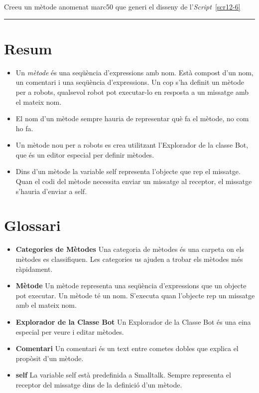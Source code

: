 \begin{center}
\colorbox{black}{}
\end{center}
{\small
\noindent
Creeu un mètode anomenat \textsf{marc50} que generi el disseny de l'\emph{Script}~\ref{scr12-6}}\\
\noindent
\rule{\textwidth}{3pt}

\section{Resum}
\begin{itemize}
\item Un \emph{mètode} és una seqüència d'expressions amb nom. Està compost d'un nom, un comentari i una seqüència d'expressions. Un cop s'ha definit un mètode per a robots, qualsevol robot pot executar-lo en resposta a un missatge amb el mateix nom. 
\item El nom d'un mètode sempre hauria de representar què fa el mètode, no com ho fa.
\item Un mètode nou per a robots es crea utilitzant l'\textsf{Explorador de la classe Bot}, que és un editor especial per definir mètodes.
\item Dins d'un mètode la variable \textsf{self} representa l'objecte que rep el missatge. Quan el codi del mètode necessita enviar un missatge al receptor, el missatge s'hauria d'enviar a \textsf{self}.
\end{itemize}

\section{Glossari} 

\begin{itemize}
\item[] \textbf{Categories de Mètodes} Una categoria de mètodes és una carpeta on els mètodes es classifiquen. Les categories us ajuden a trobar els mètodes més ràpidament.
\item[] \textbf{Mètode} Un mètode representa una seqüència d'expressions que un objecte pot executar. Un mètode té un nom. S'executa quan l'objecte rep un missatge amb el mateix nom.
\item[] \textbf{Explorador de la Classe Bot} Un \textsf{Explorador de la Classe Bot} és una eina especial per veure i editar mètodes.
\item[] \textbf{Comentari} Un comentari és un text entre cometes dobles que explica el propòsit d'un mètode.
\item[] \textbf{self} La variable \textsf{self} està predefinida a Smalltalk. Sempre representa el receptor del missatge dins de la definició d'un mètode.
\end{itemize}

